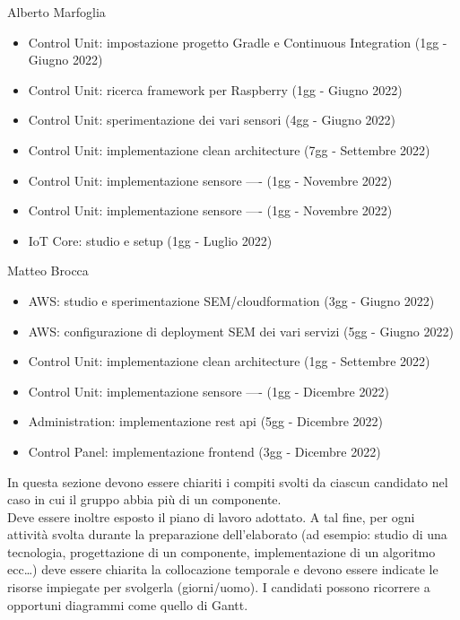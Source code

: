 Alberto Marfoglia
\begin{itemize}
    \item Control Unit: impostazione progetto Gradle e Continuous Integration (1gg - Giugno 2022) 
    \item Control Unit: ricerca framework per Raspberry (1gg - Giugno 2022) 
    \item Control Unit: sperimentazione dei vari sensori (4gg - Giugno 2022)
    \item Control Unit: implementazione clean architecture (7gg - Settembre 2022)
    \item Control Unit: implementazione sensore ---- (1gg - Novembre 2022)
    \item Control Unit: implementazione sensore ---- (1gg - Novembre 2022)
    \item IoT Core: studio e setup (1gg - Luglio 2022)
\end{itemize}

Matteo Brocca
\begin{itemize}
    \item AWS: studio e sperimentazione SEM/cloudformation (3gg - Giugno 2022) 
    \item AWS: configurazione di deployment SEM dei vari servizi (5gg - Giugno 2022) 
    \item Control Unit: implementazione clean architecture (1gg - Settembre 2022)
    \item Control Unit: implementazione sensore ---- (1gg - Dicembre 2022)
    \item Administration: implementazione rest api (5gg - Dicembre 2022) 
    \item Control Panel: implementazione frontend (3gg - Dicembre 2022) 
    
\end{itemize}






In questa sezione devono essere chiariti i compiti svolti da ciascun candidato nel caso in cui il gruppo abbia più di un componente.\\

Deve essere inoltre esposto il piano di lavoro adottato. A tal fine, per ogni attività svolta durante la preparazione dell'elaborato (ad esempio: studio di una tecnologia, progettazione di un componente, implementazione di un algoritmo ecc…) deve essere chiarita la collocazione temporale e devono essere indicate le risorse impiegate per svolgerla (giorni/uomo). I candidati possono ricorrere a opportuni diagrammi come quello di Gantt.\\


